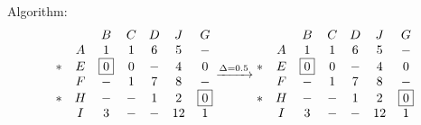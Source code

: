 \documentclass[12pt, a4]{article}
\begin{document}
Algorithm:
	\begin{equation}
		\begin{matrix}
			&&  B &  C&  D&  J&G \\ 
			&A& 1 & 1 & 6 &  5 & -\\ 
			*&E& \fbox{0} & 0 & - &  4 & 0\\ 
			&F& - & 1 & 7 &  8 & -\\ 
			*&H& - & - & 1 &  2 & \fbox{0}\\ 
			&I& 3 & - & - & 12 &1 
		\end{matrix}
		\xrightarrow{\Delta = 0.5}
		\begin{matrix}
			&&  B &  C&  D&  J&G \\ 
			&A& 1 & 1 & 6 &  5 & -\\ 
			*&E& \fbox{0} & 0 & - &  4 & 0\\ 
			&F& - & 1 & 7 &  8 & -\\ 
			*&H& - & - & 1 &  2 & \fbox{0}\\ 
			&I& 3 & - & - & 12 &1 
		\end{matrix}
	\end{equation}
\end{document}
